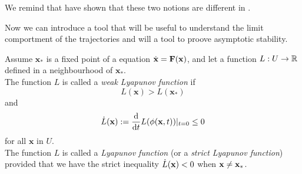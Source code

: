 \begin{remarque}
We remind that have shown that these two notions are different in .
\end{remarque}

Now we can introduce a tool that will be useful to understand the limit comportment of the trajectories and will a tool to proove asymptotic stability.

\begin{definition}
    Assume $\mathbf{x}_*$ is a fixed point of a equation $\dot{\mathbf{x}} = \mathbf{F}(\mathbf{x})$, and let a function $L:U\to\mathbb{R}$ defined in a neighbourhood of $\mathbf{x}_*$.
    \\
    The function $L$ is called a \emph{weak Lyapunov function} if \[L(\mathbf{x})>L(\mathbf{x}_*)\] 
    and 
    \[ \dot{L}(\mathbf{x}):=\frac{\mathrm{d}}{\mathrm{d} t}L(\phi(\mathbf{x},t))|_{t=0} \leq 0 \]
    for all $\mathbf{x}$ in $U$.
    \\
    The function $L$ is called a \emph{Lyapunov function} (or a \emph{strict Lyapunov function}) provided that we have the strict inequality $\dot{L}(\mathbf{x}) < 0$ when $\mathbf{x}\neq\mathbf{x}_*$.
\end{definition}

